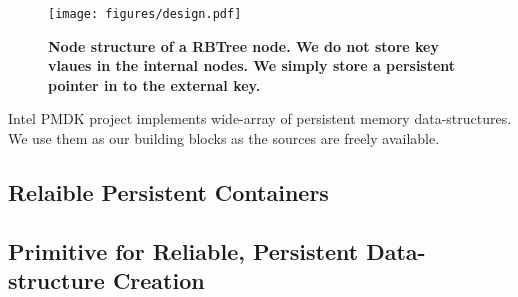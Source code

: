 \begin{figure}[]   
	\centering
	\texttt{[image: figures/design.pdf]} 
	\caption{\bf Node structure of a RBTree node. We do not store key vlaues in the internal nodes. We simply
	store a persistent pointer in to the external key.} 
	\label{fig:zerocopy} 
\end{figure}

Intel PMDK project implements wide-array of persistent memory data-structures. 
We use them as our building blocks as the sources are freely available. 

\subsection{Relaible Persistent Containers}







\subsection{Primitive for Reliable, Persistent Data-structure Creation}

